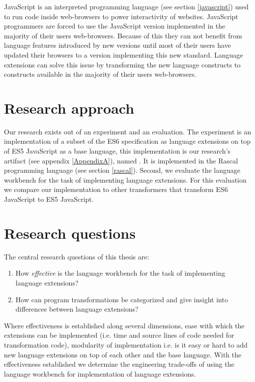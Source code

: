 JavaScript is an interpreted programming language (see section \ref{javascript}) used to run code inside web-browsers to power interactivity of websites. JavaScript programmers are forced to use the JavaScript version implemented in the majority of their users web-browsers. Because of this they can not benefit from language features introduced by new versions until most of their users have updated their browsers to a version implementing this new standard. Language extensions can solve this issue by transforming the new language constructs to constructs available in the majority of their users web-browsers.

\section{Research approach}
Our research exists out of an experiment and an evaluation. The experiment is an implementation of a subset of the ES6 specification as language extensions on top of ES5 JavaScript as a base language, this implementation is our research's artifact (see appendix \ref{AppendixA}), named \textit{\projectname}. It is implemented in the Rascal programming language (see section \ref{rascal}). Second, we evaluate the language workbench for the task of implementing language extensions. For this evaluation we compare our implementation to other transformers that transform ES6 JavaScript to ES5 JavaScript.

\section{Research questions}
The central research questions of this thesis are:

\begin{enumerate}
	\item How \textit{effective} is the language workbench for the task of implementing language extensions?
	\item How can program transformations be categorized and give insight into differences between language extensions?
\end{enumerate}

Where effectiveness is established along several dimensions, ease with which the extensions can be implemented (i.e. time and source lines of code needed for transformation code), modularity of implementation i.e. is it easy or hard to add new language extensions on top of each other and the base language. With the effectiveness established we determine the engineering trade-offs of using the language workbench for implementation of language extensions.

